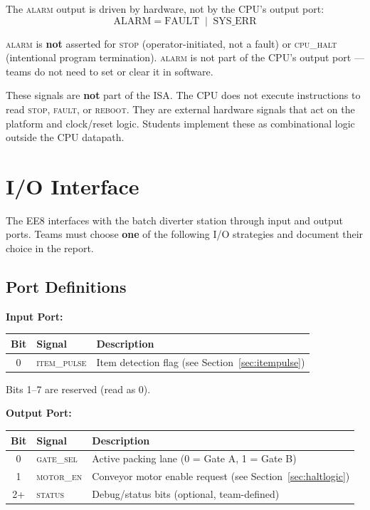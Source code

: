 \documentclass[11pt,a4paper]{article}
\newcommand{\signal}[1]{\textsc{#1}}
\begin{document}
The \signal{alarm} output is driven by hardware, not by the CPU's output port:
\[
  \text{ALARM} = \text{FAULT} \;\mathbin{|}\; \text{SYS\_ERR}
\]

\signal{alarm} is \textbf{not} asserted for \signal{stop} (operator-initiated, not a fault) or \signal{cpu\_halt} (intentional program termination). \signal{alarm} is not part of the CPU's output port --- teams do not need to set or clear it in software.

\begin{warningbox}
These signals are \textbf{not} part of the ISA. The CPU does not execute instructions to read \signal{stop}, \signal{fault}, or \signal{reboot}. They are external hardware signals that act on the platform and clock/reset logic. Students implement these as combinational logic outside the CPU datapath.
\end{warningbox}

\section{I/O Interface}

The EE8 interfaces with the batch diverter station through input and output ports. Teams must choose \textbf{one} of the following I/O strategies and document their choice in the report.

\subsection{Port Definitions}

\textbf{Input Port:}

\begin{table}[H]
\centering
\begin{tabularx}{\textwidth}{@{}clX@{}}
\toprule
\textbf{Bit} & \textbf{Signal} & \textbf{Description} \\
\midrule
0 & \signal{item\_pulse} & Item detection flag (see Section~\ref{sec:itempulse}) \\
\bottomrule
\end{tabularx}
\end{table}

Bits 1--7 are reserved (read as 0).

\textbf{Output Port:}

\begin{table}[H]
\centering
\begin{tabularx}{\textwidth}{@{}clX@{}}
\toprule
\textbf{Bit} & \textbf{Signal} & \textbf{Description} \\
\midrule
0   & \signal{gate\_sel} & Active packing lane (0 = Gate A, 1 = Gate B) \\
1   & \signal{motor\_en} & Conveyor motor enable request (see Section~\ref{sec:haltlogic}) \\
2+  & \signal{status}    & Debug/status bits (optional, team-defined) \\
\bottomrule
\end{tabularx}
\end{table}
\end{document}
